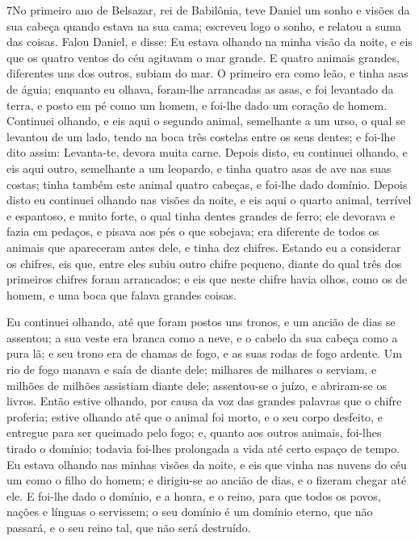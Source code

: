 \medskip

\lettrine{7} No primeiro ano de Belsazar, rei de Babilônia,
teve Daniel um sonho e visões da sua cabeça quando estava na sua
cama; escreveu logo o sonho, e relatou a suma das coisas. Falou
Daniel, e disse: Eu estava olhando na minha visão da noite, e eis
que os quatro ventos do céu agitavam o mar grande. E quatro
animais grandes, diferentes uns dos outros, subiam do mar. O
primeiro era como leão, e tinha asas de águia; enquanto eu olhava,
foram-lhe arrancadas as asas, e foi levantado da terra, e posto em
pé como um homem, e foi-lhe dado um coração de homem. Continuei
olhando, e eis aqui o segundo animal, semelhante a um urso, o qual
se levantou de um lado, tendo na boca três costelas entre os seus
dentes; e foi-lhe dito assim: Levanta-te, devora muita carne.
Depois disto, eu continuei olhando, e eis aqui outro, semelhante
a um leopardo, e tinha quatro asas de ave nas suas costas; tinha
também este animal quatro cabeças, e foi-lhe dado domínio.
Depois disto eu continuei olhando nas visões da noite, e eis
aqui o quarto animal, terrível e espantoso, e muito forte, o qual
tinha dentes grandes de ferro; ele devorava e fazia em pedaços, e
pisava aos pés o que sobejava; era diferente de todos os animais que
apareceram antes dele, e tinha dez chifres. Estando eu a
considerar os chifres, eis que, entre eles subiu outro chifre
pequeno, diante do qual três dos primeiros chifres foram arrancados;
e eis que neste chifre havia olhos, como os de homem, e uma boca que
falava grandes coisas.

Eu continuei olhando, até que foram postos uns tronos, e um ancião
de dias se assentou; a sua veste era branca como a neve, e o cabelo
da sua cabeça como a pura lã; e seu trono era de chamas de fogo, e
as suas rodas de fogo ardente. Um rio de fogo manava e saía
de diante dele; milhares de milhares o serviam, e milhões de milhões
assistiam diante dele; assentou-se o juízo, e abriram-se os livros.
Então estive olhando, por causa da voz das grandes palavras
que o chifre proferia; estive olhando até que o animal foi morto, e
o seu corpo desfeito, e entregue para ser queimado pelo fogo;
e, quanto aos outros animais, foi-lhes tirado o domínio;
todavia foi-lhes prolongada a vida até certo espaço de tempo.
Eu estava olhando nas minhas visões da noite, e eis que vinha
nas nuvens do céu um como o filho do homem; e dirigiu-se ao ancião
de dias, e o fizeram chegar até ele. E foi-lhe dado o
domínio, e a honra, e o reino, para que todos os povos, nações e
línguas o servissem; o seu domínio é um domínio eterno, que não
passará, e o seu reino tal, que não será destruído.

